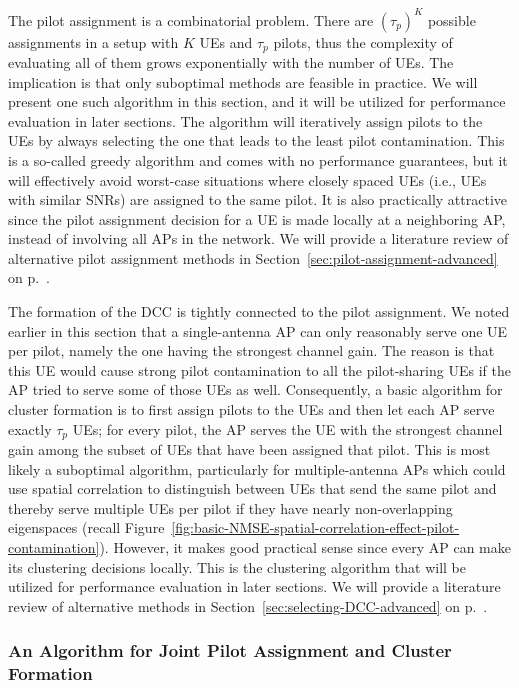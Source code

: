 The pilot assignment is a combinatorial problem. There are $(\tau_p)^K$ possible assignments in a setup with $K$ UEs and $\tau_p$ pilots, thus the complexity of evaluating all of them grows exponentially with the number of UEs.
The implication is that only suboptimal methods are feasible in practice. We will present one such algorithm in this section, and it will be utilized for performance evaluation in later sections. The algorithm will iteratively assign pilots to the UEs by always selecting the one that leads to the least pilot contamination. This is a so-called greedy algorithm and comes with no performance guarantees, but it will effectively avoid worst-case situations where closely spaced UEs (i.e., UEs with similar SNRs) are assigned to the same pilot. It is also practically attractive since the pilot assignment decision for a UE is made locally at a neighboring AP, instead of involving all APs in the network.
We will provide a literature review of alternative pilot assignment methods in Section~\ref{sec:pilot-assignment-advanced} on p.~\pageref{sec:pilot-assignment-advanced}.

\enlargethispage{\baselineskip} 

The formation of the \gls{DCC} is tightly connected to the pilot assignment. We noted earlier in this section that a single-antenna AP can only reasonably serve one UE per pilot, namely the one having the strongest channel gain. The reason is that this UE would cause strong pilot contamination to all the pilot-sharing UEs if the AP tried to serve some of those UEs as well. Consequently, a basic algorithm for cluster formation is to first assign pilots to the UEs and then let each AP serve exactly $\tau_p$ UEs; for every pilot, the AP serves the UE with the strongest channel gain among the subset of UEs that have been assigned that pilot. 
This is most likely a suboptimal algorithm, particularly for multiple-antenna APs which could use spatial correlation to distinguish between UEs that send the same pilot and thereby serve multiple UEs per pilot if they have nearly non-overlapping eigenspaces (recall Figure~\ref{fig:basic-NMSE-spatial-correlation-effect-pilot-contamination}). However, it makes good practical sense since every AP can make its clustering decisions locally.
This is the clustering algorithm that will be utilized for performance evaluation in later sections. We will provide a literature review of alternative methods in Section~\ref{sec:selecting-DCC-advanced} on p.~\pageref{sec:selecting-DCC-advanced}.


\subsubsection{An Algorithm for Joint Pilot Assignment and Cluster Formation}

